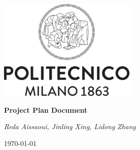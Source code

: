 \begin{titlepage}
\centering
\includegraphics[width=0.50\textwidth]{PPD/resources/logo_polimi.png}\par
\vspace{1.5cm}
{\LARGE \textbf{Project Plan Document} \par}
\vspace{0.2cm}
{\large {}\par}
\vspace{1.0cm}
{\large\itshape Reda Aissaoui,  Jinling Xing,  Lidong Zhang\par}
\vspace{2cm}
\vfill
{\large \today \par}
\end{titlepage}
